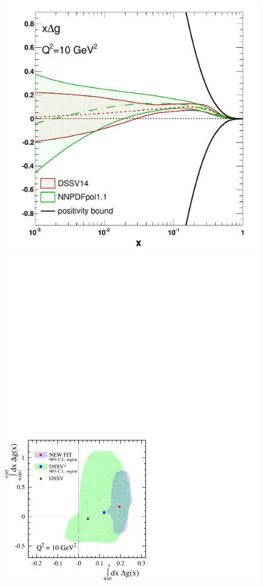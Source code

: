 \begin{figure}[!t]

\hspace*{6mm}
\includegraphics[scale=0.325]{plots/gluoncomp}

\vspace*{-15.1cm}
\hspace*{8cm}
\includegraphics[scale=0.555]{plots/correlation_getot.pdf}


\end{figure}
